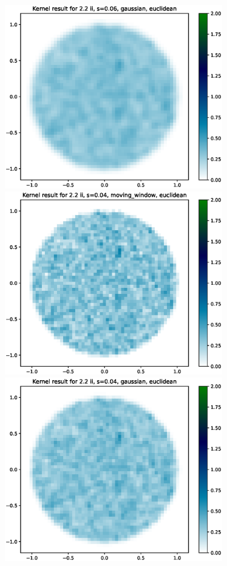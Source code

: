 \documentclass{article}
\begin{document}
\includegraphics[height=8cm]{comparisons//Kernel_result_2-2ii_s_0-06_gaussian_euclidean.eps}  \\
\hspace*{-1.5cm}\includegraphics[height=8cm]{comparisons//Kernel_result_2-2ii_s_0-04_moving_window_euclidean.eps} \hspace*{-1.5cm}
\includegraphics[height=8cm]{comparisons//Kernel_result_2-2ii_s_0-04_gaussian_euclidean.eps}  \\
\end{document}
